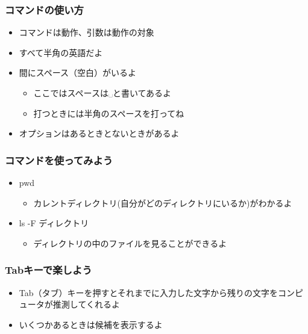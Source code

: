 \begin{frame}
    \frametitle{コマンドの使い方}
    \begin{figure}[h]
        \centering
        
    \end{figure}
    \begin{itemize}
        \item コマンドは動作、引数は動作の対象
        \item すべて半角の英語だよ
        \item 間にスペース（空白）がいるよ
            \begin{itemize}
                \item ここではスペースは␣と書いてあるよ
                \item 打つときには半角のスペースを打ってね
            \end{itemize}
        \item オプションはあるときとないときがあるよ
    \end{itemize}
\end{frame}

\begin{frame}
    \frametitle{コマンドを使ってみよう}
    \begin{itemize}
        \item pwd
        \begin{itemize}
            \item カレントディレクトリ(自分がどのディレクトリにいるか)がわかるよ
        \end{itemize}
        \item ls -F ディレクトリ
        \begin{itemize}
            \item ディレクトリの中のファイルを見ることができるよ
        \end{itemize}
    \end{itemize}
\end{frame}

\begin{frame}
    \frametitle{Tabキーで楽しよう}
    \begin{itemize}
        \item Tab（タブ）キーを押すとそれまでに入力した文字から残りの文字をコンピュータが推測してくれるよ
        \item いくつかあるときは候補を表示するよ
    \end{itemize}
    \begin{figure}[h]
        \centering
        
    \end{figure}
\end{frame}


